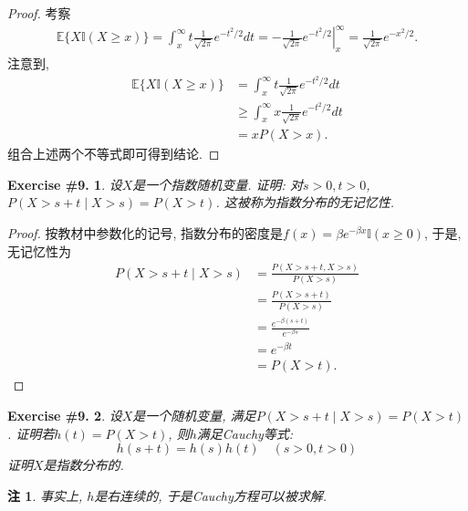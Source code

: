 \documentclass[UTF8, a4paper]{article}
\newtheorem{exercise}{Exercise \#9.}
\newtheorem*{remark}{注}
\begin{document}
\begin{proof}
考察
$$
\begin{aligned}
\mathbb{E}\{X \mathbb{I}(X\geq x)\} = \int_{x}^{\infty} t \frac{1}{\sqrt{2\pi}} e^{-t^2/2} dt = \left.-\frac{1}{\sqrt{2\pi}} e^{-t^2/2}\right|_{x}^\infty = \frac{1}{\sqrt{2\pi}}e^{-x^2/2}.
\end{aligned}
$$
注意到, 
$$
\begin{aligned}
    \mathbb{E}\{X \mathbb{I}(X\geq x)\} &= \int_{x}^{\infty} t \frac{1}{\sqrt{2\pi}} e^{-t^2/2} dt \\
    & \geq  \int_{x}^{\infty} x \frac{1}{\sqrt{2\pi}} e^{-t^2/2} dt \\
    & = xP(X > x).
\end{aligned}
$$
组合上述两个不等式即可得到结论.
\end{proof}


\begin{framed}
\begin{exercise}
设\(X\)是一个指数随机变量. 证明: 对\(s>0,t>0\),  
\(P(X > s+t\mid X>s) = P(X>t)\).
这被称为指数分布的无记忆性.
\end{exercise}
\end{framed}

\begin{proof}
    按教材中参数化的记号, 指数分布的密度是\(f(x) = \beta e^{-\beta x} \mathbb{I}(x \geq 0)\),
    于是, 无记忆性为 
$$
\begin{aligned}
    P(X > s+t\mid X>s) &= \frac{P(X > s+t, X > s)}{P(X > s)} \\
    &= \frac{P(X > s+t)}{P(X > s)} \\
    &= \frac{e^{-\beta(s+t)}}{e^{-\beta s}} \\
    &= e^{-\beta t} \\
    &= P(X > t).
\end{aligned}
$$
\end{proof}


\begin{framed}
\begin{exercise}
设\(X\)是一个随机变量, 满足\(P(X > s+t\mid X>s) = P(X>t)\).
证明若\(h(t) = P(X>t)\), 则\(h\)满足Cauchy等式:
$$
h(s+t)=h(s) h(t) \quad(s>0, t>0)
$$
证明\(X\)是指数分布的.
\end{exercise}
\end{framed}

\begin{remark}
事实上, \(h\)是右连续的, 于是Cauchy方程可以被求解.
\end{remark}
\end{document}
